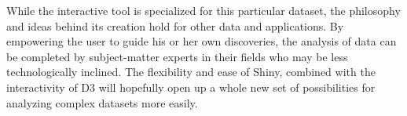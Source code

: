 \documentclass[11pt]{article}\usepackage{knitr}
\begin{document}
While the interactive tool is specialized for this particular dataset, the philosophy and ideas behind its creation hold for other data and applications. By empowering the user to guide his or her own discoveries, the analysis of data can be completed by subject-matter experts in their fields who may be less technologically inclined. The flexibility and ease of Shiny, combined with the interactivity of D3 will hopefully open up a whole new set of possibilities for analyzing complex datasets more easily.


\printbibliography
\end{document}

